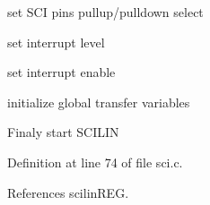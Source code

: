 \begin{DoxyItemize}
\item set S\+CI pins pullup/pulldown select ~\newline
~\newline
~\newline
~\newline

\item set interrupt level ~\newline
~\newline
~\newline

\item set interrupt enable ~\newline
~\newline

\item initialize global transfer variables ~\newline

\item Finaly start S\+C\+I\+L\+IN 
\end{DoxyItemize}

Definition at line 74 of file sci.\+c.



References scilin\+R\+EG.


